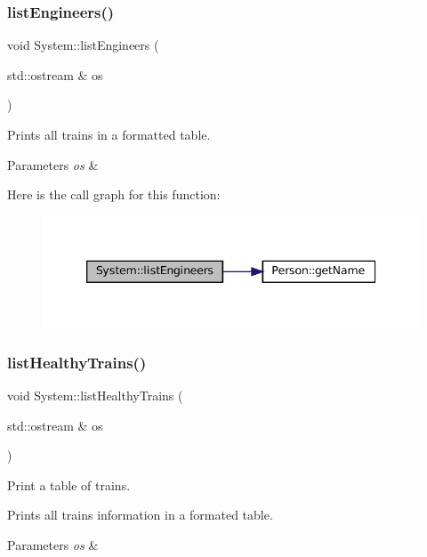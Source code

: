\subsubsection{\texorpdfstring{list\+Engineers()}{listEngineers()}}
{\footnotesize\ttfamily void System\+::list\+Engineers (\begin{DoxyParamCaption}\item[{std\+::ostream \&}]{os }\end{DoxyParamCaption})}

Prints all trains in a formatted table.


\begin{DoxyParams}{Parameters}
{\em os} & \\
\hline
\end{DoxyParams}
Here is the call graph for this function\+:
\nopagebreak
\begin{figure}[H]
\begin{center}
\leavevmode
\includegraphics[width=339pt]{classSystem_a833ba14791db12a0e6f45b17bbeef068_cgraph}
\end{center}
\end{figure}
\mbox{\label{classSystem_a54cf2411ea0b4c47a30f9e44442b59a9}} 
\subsubsection{\texorpdfstring{list\+Healthy\+Trains()}{listHealthyTrains()}}
{\footnotesize\ttfamily void System\+::list\+Healthy\+Trains (\begin{DoxyParamCaption}\item[{std\+::ostream \&}]{os }\end{DoxyParamCaption})}



Print a table of trains. 

Prints all trains\textquotesingle{} information in a formated table.


\begin{DoxyParams}{Parameters}
{\em os} & \\
\hline
\end{DoxyParams}
\mbox{\label{classSystem_a23c0b01d0e84fa4665ce85203ce6747b}} 

